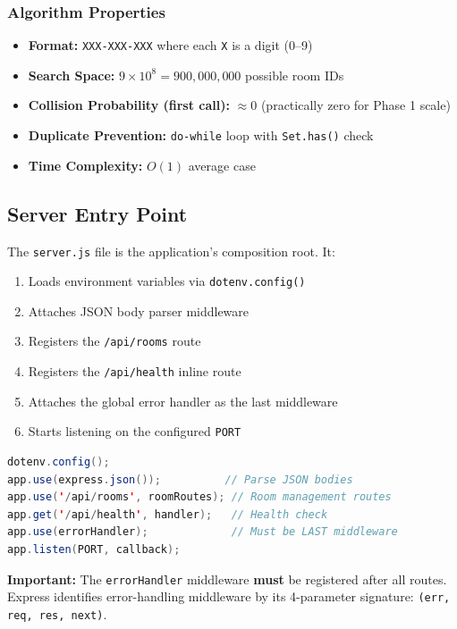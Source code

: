 \documentclass[11pt,a4paper]{article}
\begin{document}
\subsubsection{Algorithm Properties}

\begin{itemize}
    \item \textbf{Format:} \texttt{XXX-XXX-XXX} where each \texttt{X} is a digit (0--9)
    \item \textbf{Search Space:} $9 \times 10^8 = 900{,}000{,}000$ possible room IDs
    \item \textbf{Collision Probability (first call):} $\approx 0$ (practically zero for Phase 1 scale)
    \item \textbf{Duplicate Prevention:} \texttt{do-while} loop with \texttt{Set.has()} check
    \item \textbf{Time Complexity:} $O(1)$ average case
\end{itemize}

\subsection{Server Entry Point}

The \texttt{server.js} file is the application's composition root. It:

\begin{enumerate}
    \item Loads environment variables via \texttt{dotenv.config()}
    \item Attaches JSON body parser middleware
    \item Registers the \texttt{/api/rooms} route
    \item Registers the \texttt{/api/health} inline route
    \item Attaches the global error handler as the last middleware
    \item Starts listening on the configured \texttt{PORT}
\end{enumerate}

\begin{lstlisting}[language=java, caption={server.js -- Middleware Pipeline}]
dotenv.config();
app.use(express.json());          // Parse JSON bodies
app.use('/api/rooms', roomRoutes); // Room management routes
app.get('/api/health', handler);   // Health check
app.use(errorHandler);             // Must be LAST middleware
app.listen(PORT, callback);
\end{lstlisting}

\begin{infoblock}
\textbf{Important:} The \texttt{errorHandler} middleware \textbf{must} be registered after all routes. Express identifies error-handling middleware by its 4-parameter signature: \texttt{(err, req, res, next)}.
\end{infoblock}
\end{document}
